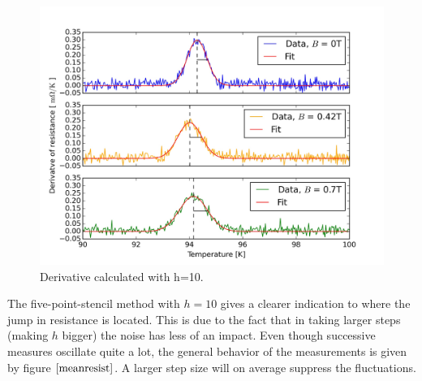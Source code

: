 \documentclass[a4paper,parskip,11pt, DIV12]{scrreprt}
\begin{document}
\begin{figure}[H]
\centering
\includegraphics[scale=0.11]{Criticaltemperature2}
\caption[]{Derivative calculated with h=10.}
\end{figure}

The five-point-stencil method with $h = 10$ gives a clearer indication to where the jump in resistance is located. This is due to the fact that in taking larger steps (making $h$ bigger) the noise has less of an impact. Even though successive measures oscillate quite a lot, the general behavior of the measurements is given by figure $\ref{meanresist}$. A larger step size will on average suppress the fluctuations.
\end{document}
